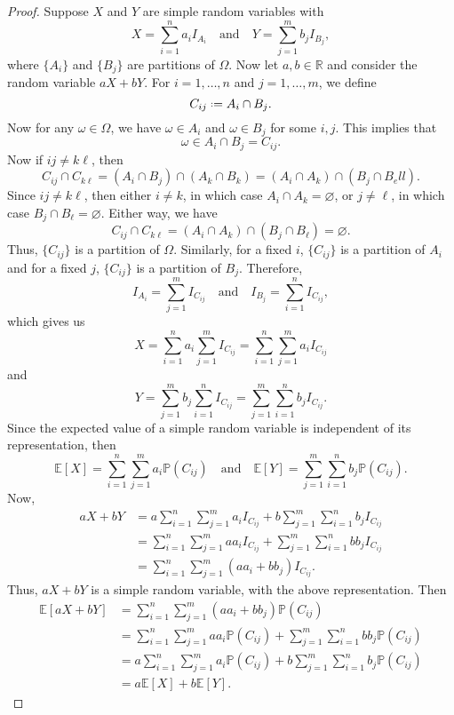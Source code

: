 \documentclass[12pt]{article}
\newcommand{\isp}[1]{\quad\text{#1}\quad}
\newcommand*{\defeq}{\mathrel{\vcenter{\baselineskip0.5ex \lineskiplimit0pt\hbox{\scriptsize.}\hbox{\scriptsize.}}}=}
\let\emptyset\varnothing %
\newcommand{\R}{\mathbb{R}} %
\renewcommand{\P}{\mathbb{P}} %
\newcommand{\E}{\mathbb{E}} %
\newcommand{\<}{\left\langle} %
\renewcommand{\>}{\right\rangle} %
\begin{document}
\begin{proof}
    Suppose $X$ and $Y$ are simple random variables with
    \[X = \sum_{i = 1}^n a_i I_{A_i} \isp{and} Y = \sum_{j = 1}^m b_j I_{B_j},\]
    where $\{A_i\}$ and $\{B_j\}$ are partitions of $\Omega$. Now let $a, b \in \R$ and consider the random variable $aX + bY$. For $i = 1, \dots, n$ and $j = 1, \dots, m$, we define
    \[C_{ij} \defeq A_i \cap B_j.\]
    Now for any $\omega \in \Omega$, we have $\omega \in A_i$ and $\omega \in B_j$ for some $i,j$. This implies that
    \[\omega \in A_i \cap B_j = C_{ij}.\]
    Now if $ij \ne k\ell$, then
    \[C_{ij} \cap C_{k\ell} = (A_i \cap B_j) \cap (A_k \cap B_k) = (A_i \cap A_k) \cap (B_j \cap B_ell).\]
    Since $ij \ne k\ell$, then either $i\ne k$, in which case $A_i\cap A_k = \emptyset$, or $j \ne \ell$, in which case $B_j \cap B_\ell = \emptyset$. Either way, we have
    \[C_{ij} \cap C_{k\ell} = (A_i \cap A_k) \cap (B_j \cap B_\ell) = \emptyset.\]
    Thus, $\{C_{ij}\}$ is a partition of $\Omega$. Similarly, for a fixed $i$, $\{C_{ij}\}$ is a partition of $A_i$ and for a fixed $j$, $\{C_{ij}\}$ is a partition of $B_j$. Therefore,
    \[I_{A_i} = \sum_{j=1}^m I_{C_{ij}} \isp{and} I_{B_j} = \sum_{i=1}^n I_{C_{ij}},\]
    which gives us
    \[X = \sum_{i = 1}^n a_i \sum_{j=1}^m I_{C_{ij}} = \sum_{i = 1}^n \sum_{j=1}^m a_i I_{C_{ij}}\]
    and
    \[Y = \sum_{j = 1}^m b_j \sum_{i=1}^n I_{C_{ij}} = \sum_{j = 1}^m \sum_{i=1}^n b_j I_{C_{ij}}.\]
    Since the expected value of a simple random variable is independent of its representation, then
    \[\E[X] = \sum_{i = 1}^n \sum_{j=1}^m a_i \P(C_{ij}) \isp{and} \E[Y] = \sum_{j = 1}^m \sum_{i=1}^n b_j \P(C_{ij}).\]
    Now,
    \begin{align*}
        aX + bY
            &= a\sum_{i = 1}^n \sum_{j=1}^m a_i I_{C_{ij}} + b\sum_{j = 1}^m \sum_{i=1}^n b_j I_{C_{ij}} \\
            &= \sum_{i = 1}^n \sum_{j = 1}^m a a_i I_{C_{ij}} + \sum_{j = 1}^m \sum_{i = 1}^n b b_j I_{C_{ij}} \\
            &= \sum_{i = 1}^n \sum_{j = 1}^m (a a_i + b b_j) I_{C_{ij}}.
    \end{align*}
    Thus, $aX + bY$ is a simple random variable, with the above representation. Then
    \begin{align*}
        \E[aX + bY]
            &= \sum_{i = 1}^n \sum_{j = 1}^m (a a_i + b b_j) \P(C_{ij}) \\
            &= \sum_{i = 1}^n \sum_{j = 1}^m a a_i \P(C_{ij}) + \sum_{j = 1}^m \sum_{i = 1}^n b b_j \P(C_{ij}) \\
            &= a\sum_{i = 1}^n \sum_{j = 1}^m a_i \P(C_{ij}) + b\sum_{j = 1}^m \sum_{i = 1}^n b_j \P(C_{ij}) \\
            &= a\E[X] + b\E[Y].
    \end{align*}

    
\end{proof}
\end{document}
